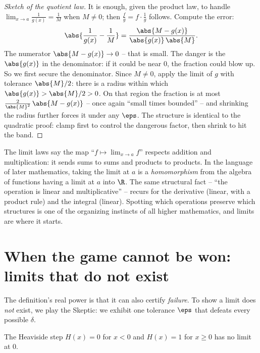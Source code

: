 \begin{proof}[Sketch of the quotient law]
It is enough, given the product law, to handle $\lim_{x\to a}\frac{1}{g(x)} =
\frac{1}{M}$ when $M\ne0$; then $\frac{f}{g}=f\cdot\frac1g$ follows. Compute the
error:
\[
  \abs{\frac{1}{g(x)} - \frac{1}{M}}
  = \frac{\abs{M - g(x)}}{\abs{g(x)}\,\abs{M}}.
\]
The numerator $\abs{M-g(x)}\to0$ -- that is small. The danger is the
$\abs{g(x)}$ in the denominator: if it could be near $0$, the fraction could blow
up. So we first secure the denominator. Since $M\ne0$, apply the limit of $g$
with tolerance $\abs{M}/2$: there is a radius within which $\abs{g(x)} >
\abs{M}/2 > 0$. On that region the fraction is at most
$\frac{2}{\abs{M}^2}\,\abs{M-g(x)}$ -- once again ``small times bounded'' -- and
shrinking the radius further forces it under any $\eps$. The structure is
identical to the quadratic proof: clamp first to control the dangerous factor,
then shrink to hit the band.
\end{proof}

\begin{connectionbox}
The limit laws say the map ``$f \mapsto \lim_{x\to a}f$'' respects addition and
multiplication: it sends sums to sums and products to products. In the language
of later mathematics, taking the limit at $a$ is a \emph{homomorphism} from the
algebra of functions having a limit at $a$ into $\R$. The same structural fact --
``the operation is linear and multiplicative'' -- recurs for the derivative
(linear, with a product rule) and the integral (linear). Spotting which
operations preserve which structures is one of the organizing instincts of all
higher mathematics, and limits are where it starts.
\end{connectionbox}

\section{When the game cannot be won: limits that do not exist}
\label{ch06:no-limit}

The definition's real power is that it can also certify \emph{failure}. To show a
limit does \emph{not} exist, we play the Skeptic: we exhibit one tolerance $\eps$
that defeats every possible $\delta$.

\begin{example}[A jump]
\label{ch06:ex-jump}
The Heaviside step $H(x)=0$ for $x<0$ and $H(x)=1$ for $x\ge 0$ has no limit at
$0$.
\end{example}


